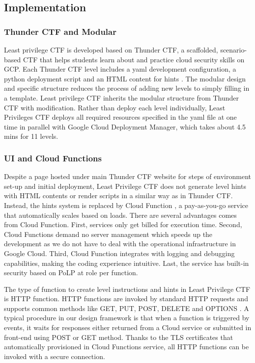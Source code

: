 \documentclass[a4paper,twoside]{article}
\begin{document}
\subsection{Implementation}

\subsubsection{Thunder CTF and Modular}
Least privilege CTF is developed based on Thunder CTF, a scaffolded, scenario-based CTF that helps students learn about and practice cloud security skills on GCP. Each Thunder CTF level includes a yaml development configuration, a python deployment script and an HTML content for hints \cite{Springer}. The modular design and specific structure reduces the process of adding new levels to simply filling in a template. Least privilege CTF inherits the modular structure from Thunder CTF with modification. Rather than deploy each level individually, Least Privileges CTF deploys all required resources specified in the yaml file at one time in parallel with Google Cloud Deployment Manager, which takes about 4.5 mins for 11 levels.

\subsubsection{UI and Cloud Functions}
Despite a page \cite{lst-ctf} hosted under main Thunder CTF website for steps of environment set-up and initial deployment, Least Privilege CTF does not generate level hints with HTML contents or render scripts in a similar way as in Thunder CTF. Instead, the hints system is replaced by Cloud Function \cite{cloudfunc}, a pay-as-you-go service that automatically scales based on loads. There are several advantages comes from Cloud Function. First, services only get billed for execution time. Second, Cloud Functions demand no server management which speeds up the development as we do not have to deal with the operational infrastructure in Google Cloud. Third, Cloud Function integrates with logging and debugging capabilities, making the coding experience intuitive. Last, the service has built-in security based on PoLP at role per function. 

The type of function to create level instructions and hints in Least Privilege CTF is HTTP function. HTTP functions are invoked by standard HTTP requests and supports common methods like GET, PUT, POST, DELETE and OPTIONS \cite{httpfunc}. A typical procedure in our design framework is that when a function is triggered by events, it waits for responses either returned from a Cloud service or submitted in front-end using POST or GET method. Thanks to the TLS certificates that automatically provisioned in Cloud Functions service, all HTTP functions can be invoked with a secure connection. 
\end{document}
